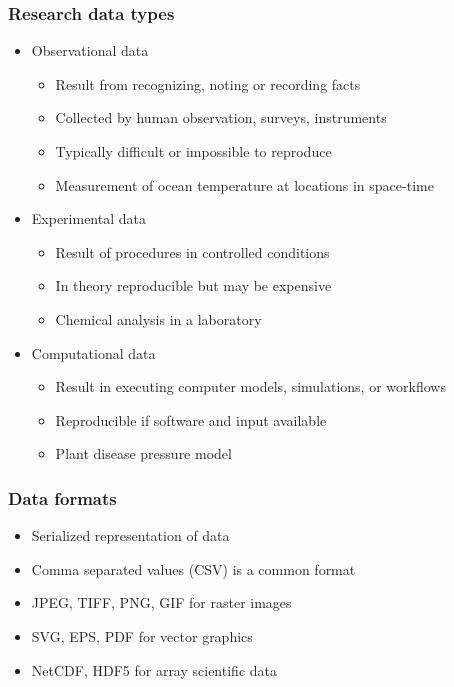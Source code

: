 \documentclass{beamer}
\begin{document}
\begin{frame}
  \frametitle{Research data types}
  
  \begin{itemize}
  \item Observational data
  \begin{itemize}
    \item Result from recognizing, noting or recording facts
    \item Collected by human observation, surveys, instruments
    \item Typically difficult or impossible to reproduce
    \item Measurement of ocean temperature at locations in space-time
  \end{itemize}
  \item Experimental data
  \begin{itemize}
    \item Result of procedures in controlled conditions
    \item In theory reproducible but may be expensive
    \item Chemical analysis in a laboratory
  \end{itemize}
  \item Computational data
  \begin{itemize}
    \item Result in executing computer models, simulations, or workflows
    \item Reproducible if software and input available
    \item Plant disease pressure model
  \end{itemize}
  \end{itemize}
\end{frame}


\begin{frame}
  \frametitle{Data formats}
  
  \begin{itemize}
  \item Serialized representation of data
  \item Comma separated values (CSV) is a common format
  \item JPEG, TIFF, PNG, GIF for raster images
  \item SVG, EPS, PDF for vector graphics
  \item NetCDF, HDF5 for array scientific data
  \end{itemize}
\end{frame}
\end{document}
